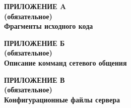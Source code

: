 \begin{center}
\textbf{
\MakeUppercase{Приложение A}\\
(обязательное)\\
Фрагменты исходного кода}
\end{center}

\begin{center}
\textbf{
\MakeUppercase{Приложение Б}\\
(обязательное)\\
Описание комманд сетевого общения}
\end{center}

\begin{center}
\textbf{
\MakeUppercase{Приложение В}\\
(обязательное)\\
Конфигурационные файлы сервера}
\end{center}
